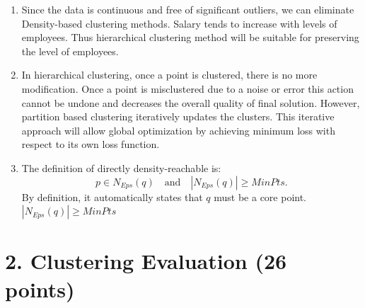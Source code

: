 \documentclass[12pt]{article}
\begin{document}
\begin{enumerate}[label=(\alph*)]
    If one centroid is placed very far from datapoints, it may not be assigned any points as the data points will choose the nearest centroid.
    If a dataset can be clearly separated into, say two clusters, and then K-Means is asked to find 10 clusters, the other 8-non-relevant centroids may not be assigned any points.


    \vspace{2em}

    \item 

    Since the data is continuous and free of significant outliers, we can eliminate Density-based clustering methods.
    Salary tends to increase with levels of employees. Thus hierarchical clustering method will be suitable for preserving the level of employees.


    \vspace{2em}

    \item

    In hierarchical clustering, once a point is clustered, there is no more modification. Once a point is misclustered due to a noise or error 
    this action cannot be undone and decreases the overall quality of final solution.
    However, partition based clustering iteratively updates the clusters. This iterative approach will allow global optimization
    by achieving minimum loss with respect to its own loss function.

    \vspace{2em}

    \item
    The definition of directly density-reachable is:
    \[
        p \in N_{\mathit{Eps}}(q) \quad \text{and} \quad |N_{\mathit{Eps}}(q)| \geq \mathit{MinPts}.
    \]
    By definition, it automatically states that $q$ must be a core point. $|N_{\mathit{Eps}}(q)| \geq \mathit{MinPts}$


\end{enumerate}

\newpage
\section*{2. Clustering Evaluation (26 points)}
\end{document}
